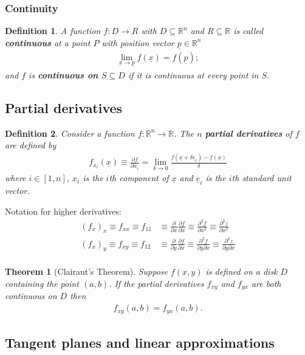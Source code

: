 \documentclass{article}
\theoremstyle{sltheorem}
\newtheorem{definition}{Definition}[section]
\newtheorem{theorem}{Theorem}[section]
\newcommand{\R}{\mathbb{R}}
\newcommand{\p}{\partial}
\renewcommand{\vec}{\underline}
\newcommand*\B[1]{\textbf{#1}}
\begin{document}
\subsubsection{Continuity}
\begin{definition}
    A function $f:D\to R$ with $D\subseteq\R^n$ and $R\subseteq\R$
    is called \B{continuous} at a point $P$ with position vector $\vec p\in \R^n$
    \begin{align*}
        \lim_{\vec x\to \vec p}f(\vec x) = f(\vec p);
    \end{align*}
    and $f$ is \B{continuous on $S\subseteq D$} if it is continuous at 
    every point in $S$.
\end{definition}
\subsection{Partial derivatives}
\begin{definition}
    Consider a function $f:\R^n\to\R$. The $n$ \B{partial derivatives} of
    $f$ are defined by
    \begin{align*}
        f_{x_i}(\vec x)\equiv\frac{\p f}{\p x_i}=\lim_{\delta\to 0}\frac{f(\vec x + \delta \vec e_i)-f(\vec x)}{\delta}
    \end{align*}
    where $i\in[1,n]$, $x_i$ is the $i$th component of $\vec x$ and $\vec e_i$ is the
    $i$th standard unit vector.
\end{definition}
Notation for higher derivatives:
\begin{align*}
    (f_x)_x \equiv f_{xx} \equiv f_{11} 
    &\equiv \frac{\p}{\p x}\frac{\p f}{\p x} 
    \equiv \frac{\p^2 f}{\p x^2}
    \equiv \frac{\p^2 z}{\p x^2}\\
    (f_x)_y \equiv f_{xy} \equiv f_{12} 
    &\equiv \frac{\p}{\p y}\frac{\p f}{\p x} 
    \equiv \frac{\p^2 f}{\p y \p x}
    \equiv \frac{\p^2 z}{\p y \p x}\\
\end{align*}
\begin{theorem}[Clairaut's Theorem]
    Suppose $f(x,y)$ is defined on a disk $D$ containing the point $(a,b)$.
    If the partial derivatives $f_{xy}$ and $f_{yx}$ are both continuous
    on $D$ then
    \begin{align*}
        f_{xy}(a,b)=f_{yx}(a,b).
    \end{align*}
\end{theorem}
\subsection{Tangent planes and linear approximations}
\end{document}
